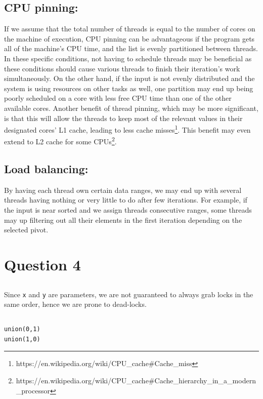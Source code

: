 \documentclass[a5paper]{article}
\begin{document}
\subsection{CPU pinning:} If we assume that the total number of threads is equal to the number of cores on the machine of execution, CPU pinning can be advantageous if the program gets all of the machine's CPU time, and the list is evenly partitioned between threads. In these specific conditions, not having to schedule threads may be beneficial as these conditions should cause various threads to finish their iteration's work simultaneously. On the other hand, if the input is not evenly distributed and the system is using resources on other tasks as well, one partition may end up being poorly scheduled on a core with less free CPU time than one of the other available cores. Another benefit of thread pinning, which may be more significant, is that this will allow the threads to keep most of the relevant values in their designated cores' L1 cache, leading to less cache misses\footnote{https://en.wikipedia.org/wiki/CPU\_cache\#Cache\_miss}. This benefit may even extend to L2 cache for some CPUs\footnote{https://en.wikipedia.org/wiki/CPU\_cache\#Cache\_hierarchy\_in\_a\_modern\_processor}.
\subsection{Load balancing:}
By having each thread own certain data ranges, we may end up with several threads having nothing or very little to do after few iterations. For example, if the input is near sorted and we assign threads consecutive ranges, some threads may up filtering out all their elements in the first iteration depending on the selected pivot.

\section{Question 4}
\subsection{}
Since \texttt{x} and \texttt{y} are parameters, we are not guaranteed to always grab locks in the same order, hence we are prone to dead-locks.

\subsection{}

\begin{lstlisting}
union(0,1)
union(1,0)
\end{lstlisting}
\end{document}
